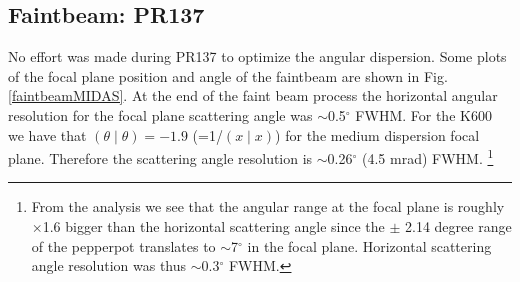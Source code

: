 \documentclass[11pt]{report}
\begin{document}




\subsection{Faintbeam: PR137}\label{sec:FB_PR137}

No effort was made during PR137 to optimize the angular dispersion. Some plots of
the focal plane position and angle of the faintbeam are shown in Fig.\ref{faintbeamMIDAS}. 
At the end of the faint beam process the horizontal angular resolution for the focal plane scattering
angle was $\sim$0.5$^{\circ}$ FWHM. 
For the K600 we have that  $(\theta \mid \theta)=-1.9$ (=1/$(x \mid x)$) for the medium dispersion focal plane.
Therefore the scattering angle resolution is $\sim$0.26$^{\circ}$ (4.5 mrad) FWHM. 
\footnote{From the analysis we see  that the angular range at the focal plane is roughly $\times$1.6 
bigger than the horizontal scattering angle
since the $\pm$ 2.14 degree range of the pepperpot translates to $\sim$7$^{\circ}$ in the focal plane.
Horizontal scattering angle resolution was thus $\sim$0.3$^{\circ}$ FWHM.}
\end{document}

